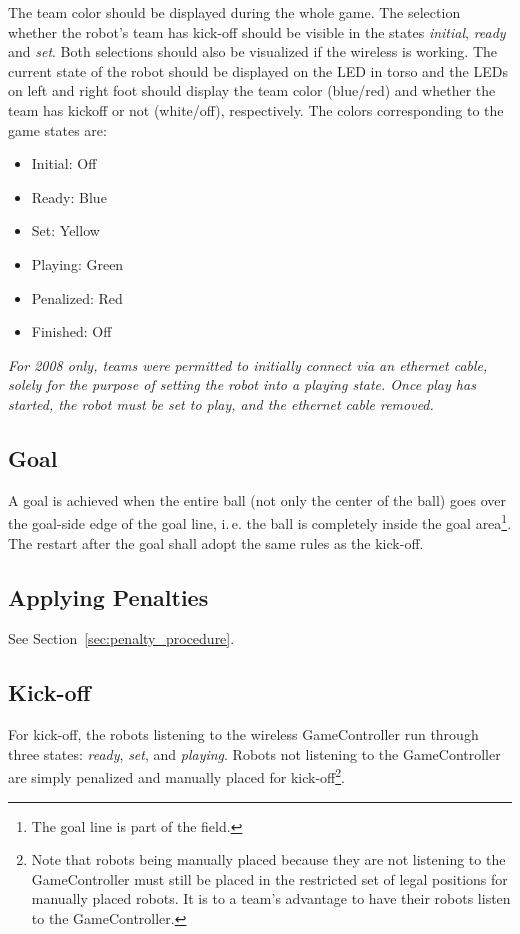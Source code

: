 \documentclass[12pt]{article}
\newcommand{\ie}{\mbox{i.\,e.}\xspace}
\begin{document}
The team color should be displayed during the whole game. The
selection whether the robot's team has kick-off should be visible in
the states \emph{initial}, \emph{ready} and \emph{set}. Both
selections should also be visualized if the wireless is working. The current state of the robot should be displayed on the LED in torso and the LEDs on left and right foot should display the team color (blue/red) and whether the team has kickoff or not (white/off), respectively. The colors corresponding to the game states are:

\begin{itemize}
 \item Initial: Off
 \item Ready: Blue
 \item Set: Yellow
 \item Playing: Green
 \item Penalized: Red
 \item Finished: Off
\end{itemize}

\emph{For 2008 only, teams were permitted to initially connect via an ethernet cable, solely for the purpose of setting the robot into a playing state. Once play has started, the robot must be set to play, and the ethernet cable removed. }


\subsection{Goal}
A goal is achieved when the entire ball (not only the center of the
ball) goes over the goal-side edge of the goal line, \ie the ball
is completely inside the goal area\footnote{The goal line is part of
the field.}. The restart after the goal shall adopt the same
rules as the kick-off.

\subsection{Applying Penalties}
See Section~\ref{sec:penalty_procedure}.

\subsection{Kick-off}
\label{sec:kick-off}

For kick-off, the robots listening to the wireless GameController
run through three states: \emph{ready},
\emph{set}, and \emph{playing}.  Robots not listening to the
GameController are simply penalized and manually placed for kick-off\footnote{
Note that robots being manually placed because they are not listening to the 
GameController must still be placed in the restricted set of legal positions
for manually placed robots.  It is to a team's advantage to have their robots
listen to the GameController.}.
\end{document}
